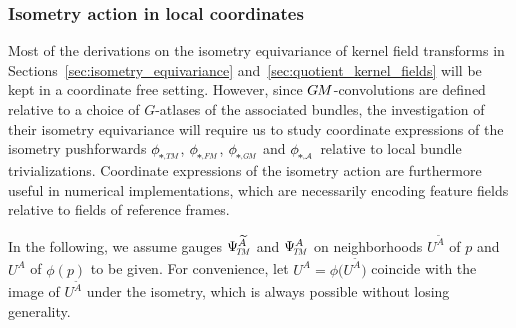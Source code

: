 \subsubsection{Isometry action in local coordinates}
\label{sec:isom_coordinatization}

Most of the derivations on the isometry equivariance of kernel field transforms in Sections~\ref{sec:isometry_equivariance} and~\ref{sec:quotient_kernel_fields} will be kept in a coordinate free setting.
However, since $G\mkern-1.4muM$-convolutions are defined relative to a choice of $G$-atlases of the associated bundles, the investigation of their isometry equivariance will require us to study coordinate expressions of the isometry pushforwards $\dphiTM$, $\dphiFM$, $\dphiGM$ and $\dphiA$ relative to local bundle trivializations.
Coordinate expressions of the isometry action are furthermore useful in numerical implementations, which are necessarily encoding feature fields relative to fields of reference frames.

In the following, we assume gauges $\PsiTM^{\widetilde{A}}$ and $\PsiTM^A$ on neighborhoods $U^{\widetilde{A}}$ of $p$ and $U^A$ of $\phi(p)$ to be given.
For convenience, let $U^A = \phi\big(U^{\widetilde{A}}\big)$ coincide with the image of $U^{\widetilde{A}}$ under the isometry, which is always possible without losing generality.




